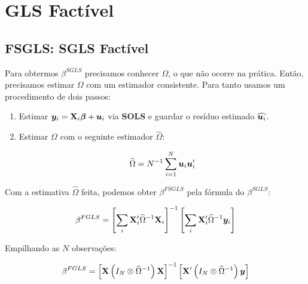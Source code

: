 \documentclass[11pt, oneside, a4paper, article]{article}
\numberwithin{equation}{section}
\begin{document}
\clearpage
\section{GLS Factível}

\noindent
\citet[Sec.7.5 -- Feasible GLS, p.153]{wool-2010} 

\subsection*{FSGLS: SGLS Factível}

Para obtermos $\beta^{SGLS}$ precisamos conhecer $\Omega$, o que não ocorre na prática.
Então, precisamos estimar $\Omega$ com um estimador consistente.
Para tanto usamos um procedimento de dois passos:

\begin{enumerate}
\item  %
Estimar $\boldsymbol{y}_{i} = \mathbf{X}_{i} \boldsymbol{\beta} + \boldsymbol{u}_{i}$ via \textbf{SOLS} e guardar o resíduo estimado $\widehat{\boldsymbol{u}_{i}}$.

\item  %
Estimar $\Omega$ com o seguinte estimador $\widehat{\Omega}$:

\vspace{-1.5 em}
\begin{align*}
	\widehat{\Omega} 
	= 
	N^{-1} \sum_{i=1}^{N} \boldsymbol{u}_{i} \boldsymbol{u}_{i}'
\end{align*}
\end{enumerate}

Com a estimativa $\widehat{\Omega}$ feita, podemos obter $\beta^{FSGLS}$ pela fórmula do $\beta^{SGLS}$:

\vspace{-1.5 em}
\begin{align*}
	\beta^{FGLS}
	= 
	\left[ 
		\sum_{i} \mathbf{X}_{i}' \widehat{\Omega}^{-1} \mathbf{X}_{i}
	\right]^{-1}
	\left[ 
		\sum_{i} \mathbf{X}_{i}' \widehat{\Omega}^{-1} \boldsymbol{y}_{i}
	\right]
\end{align*}

Empilhando as $N$ observações:

\vspace{-1.5 em}
\begin{align*}
\beta^{FGLS}
= 
\left[ \mathbf{X} \left( I_{N} \otimes \widehat{\Omega}^{-1} \right) \mathbf{X} \right]^{-1}
\left[ \mathbf{X}' \left( I_{N} \otimes \widehat{\Omega}^{-1} \right) \boldsymbol{y} \right]
\end{align*}
\end{document}
